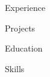 \documentclass[11pt, letterpaper]{article}
\author{Ben Chislett}
\begin{document}
\begin{section}{Experience}
\blindtext
\end{section}

\begin{section}{Projects}
\blindtext
\end{section}

\begin{section}{Education}
\blindtext
\end{section}

\begin{section}{Skills}
\blindtext
\end{section}
\end{document}
